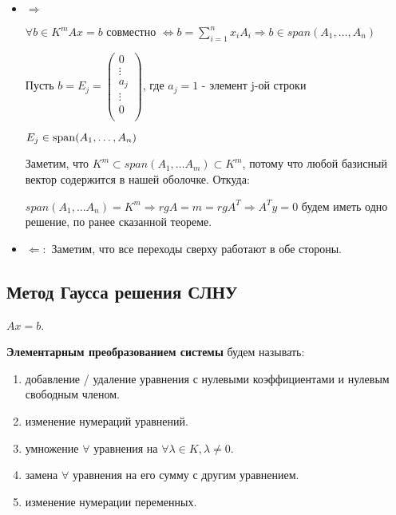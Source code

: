 \begin{itemize}
    \item \(\Rightarrow\)

          \(\forall b \in K^m Ax = b\) совместно \(\Leftrightarrow b = \sum\limits_{i=1}^n x_iA_i  \Rightarrow b \in span(A_1,\ldots,A_n)\)

          Пусть \(b = E_j = \begin{pmatrix}
              0 \\ \vdots\\a_j\\ \vdots\\ 0 \\
          \end{pmatrix}\), где \(a_j = 1\) - элемент j-ой строки

          \(E_j \in \operatorname{span}(A_1,\ldots, A_n)\)

          Заметим, что \(K^m \subset span(A_1,\ldots A_m) \subset K^m\), потому что любой базисный вектор  содержится в нашей оболочке. Откуда:

          \(span(A_1,\ldots A_n)  = K^m \Rightarrow rg A = m = rg A^T \Rightarrow A^Ty=0\) будем иметь одно решение, по ранее сказанной теореме.

    \item \(\Leftarrow:\)
          Заметим, что все переходы сверху работают в обе стороны.

\end{itemize}

\subsection{Метод Гаусса решения СЛНУ}

\(Ax=b\).

\textbf{Элементарным преобразованием системы} будем называть:

\begin{enumerate}
    \item добавление / удаление уравнения с нулевыми коэффициентами и нулевым свободным членом.
    \item изменение нумераций уравнений.
    \item умножение \(\forall\) уравнения на \(\forall \lambda \in K, \lambda \neq 0\).
    \item замена \(\forall\) уравнения на его сумму с другим уравнением.
    \item изменение нумерации переменных.
\end{enumerate}

